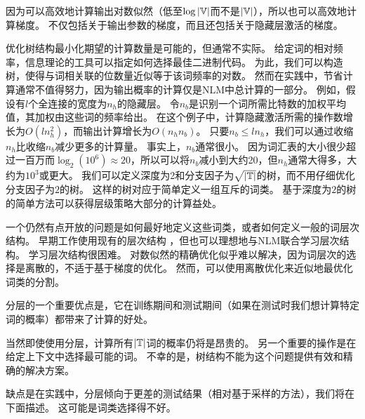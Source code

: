 因为可以高效地计算输出对数似然（低至$\log |\mathbb{V}|$而不是$ |\mathbb{V}|$），所以也可以高效地计算梯度。
不仅包括关于输出参数的梯度，而且还包括关于隐藏层激活的梯度。

优化树结构最小化期望的计算数量是可能的，但通常不实际。
给定词的相对频率，信息理论的工具可以指定如何选择最佳二进制代码。
为此，我们可以构造树，使得与词相关联的位数量近似等于该词频率的对数。
然而在实践中，节省计算通常不值得努力，因为输出概率的计算仅是\gls{NLM}中总计算的一部分。
例如，假设有$l$个全连接的宽度为$n_h$的隐藏层。
令$n_b$是识别一个词所需比特数的加权平均值，其加权由这些词的频率给出。
在这个例子中，计算隐藏激活所需的操作数增长为$O(ln_h^2)$，而输出计算增长为$O(n_h n_b)$。
只要$ n_b \leq l n_h$，我们可以通过收缩$n_h$比收缩$n_b$减少更多的计算量。
事实上，$n_b$通常很小。
因为词汇表的大小很少超过一百万而$\log_ 2(10^6) \approx 20$，所以可以将$n_b$减小到大约20，但$n_h$通常大得多，大约为$10^3$或更大。
我们可以定义深度为2和分支因子为$\sqrt{|\mathbb{T}|}$的树，而不用仔细优化分支因子为$2$的树。
这样的树对应于简单定义一组互斥的词类。
基于深度为$2$的树的简单方法可以获得层级策略大部分的计算益处。


一个仍然有点开放的问题是如何最好地定义这些词类，或者如何定义一般的词层次结构。
早期工作使用现有的层次结构\citep{Morin+Bengio-2005-small} ，但也可以理想地与\gls{NLM}联合学习层次结构。
学习层次结构很困难。
对数似然的精确优化似乎难以解决，因为词层次的选择是离散的，不适于基于梯度的优化。
然而，可以使用离散优化来近似地最优化词类的分割。

分层的一个重要优点是，它在训练期间和测试期间（如果在测试时我们想计算特定词的概率）都带来了计算的好处。

当然即使使用分层，计算所有$|\mathbb{T}|$词的概率仍将是昂贵的。
另一个重要的操作是在给定上下文中选择最可能的词。
不幸的是，树结构不能为这个问题提供有效和精确的解决方案。

缺点是在实践中，分层倾向于更差的测试结果（相对基于采样的方法），我们将在下面描述。
这可能是词类选择得不好。


